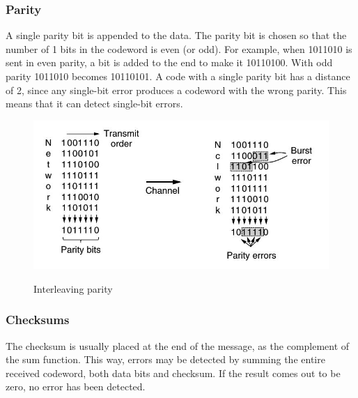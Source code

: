 \documentclass[a4paper,oneside]{book}
\begin{document}
\subsubsection{Parity}
A single parity bit is appended to the data. The parity bit is chosen so that the number of 1 bits in the codeword is even (or odd). 
For example, when 1011010 is sent in even parity, a bit is added to the end to make it 10110100. With odd parity 1011010 becomes
10110101. A code with a single parity bit has a distance of 2, since any single-bit error produces a codeword with the wrong parity. This means that it can detect single-bit errors.
\begin{figure}[H]
\caption{Interleaving parity}
\includegraphics[scale=0.6]{Images/interleavingparity}
\label{fig:cn_inter_parity}
\end{figure}
\subsubsection{Checksums}
The checksum is usually placed at the end of the message, as the complement of the sum function. This way, errors may be detected by summing the entire received codeword, both data bits and checksum. If the result comes out to be zero, no error has been detected.
\end{document}
